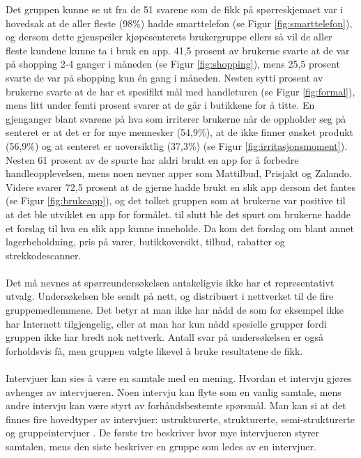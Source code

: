 Det gruppen kunne se ut fra de 51 svarene som de fikk på spørreskjemaet var i hovedsak at de aller fleste (98\%) hadde smarttelefon (se Figur \ref{fig:smarttelefon}), og dersom dette gjenspeiler kjøpesenterets brukergruppe ellers så vil de aller fleste kundene kunne ta i bruk en app. 41,5 prosent av brukerne svarte at de var på shopping 2-4 ganger i måneden (se Figur \ref{fig:shopping}), mens 25,5 prosent svarte de var på shopping kun én gang i måneden. Nesten sytti prosent av brukerne svarte at de har et spesifikt mål med handleturen (se Figur \ref{fig:formal}), mens litt under femti prosent svarer at de går i butikkene for å titte. En gjenganger blant svarene på hva som irriterer brukerne når de oppholder seg på senteret er at det er for mye mennesker (54,9\%), at de ikke finner ønsket produkt (56,9\%) og at senteret er uoversiktlig (37,3\%) (se Figur \ref{fig:irritasjonsmoment}). Nesten 61 prosent av de spurte har aldri brukt en app for å forbedre handleopplevelsen, mens noen nevner apper som Mattilbud, Prisjakt og Zalando. Videre svarer 72,5 prosent at de gjerne hadde brukt en slik app dersom det fantes (se Figur \ref{fig:brukeapp}), og det tolket gruppen som at brukerne var positive til at det ble utviklet en app for formålet. til slutt ble det spurt om brukerne hadde et forslag til hva en slik app kunne inneholde. Da kom det forslag om blant annet lagerbeholdning, pris på varer, butikkoversikt, tilbud, rabatter og strekkodescanner.
\\\\
Det må nevnes at spørreundersøkelsen antakeligvis ikke har et representativt utvalg. Undersøkelsen ble sendt på nett, og distribuert i nettverket til de fire gruppemedlemmene. Det betyr at man ikke har nådd de som for eksempel ikke har Internett tilgjengelig, eller at man har kun nådd spesielle grupper fordi gruppen ikke har bredt nok nettverk. Antall svar på undersøkelsen er også forholdsvis få, men gruppen valgte likevel å bruke resultatene de fikk. 
\\\\
Intervjuer kan sies å være en samtale med en mening\cite{kahn}. Hvordan et intervju gjøres avhenger av intervjueren. Noen intervju kan flyte som en vanlig samtale, mens andre intervju kan være styrt av forhåndsbestemte spørsmål. Man kan si at det finnes fire hovedtyper av intervjuer: ustrukturerte, strukturerte, semi-strukturerte og gruppeintervjuer \cite[s.~233]{preece}. De første tre beskriver hvor mye intervjueren styrer samtalen, mens den siste beskriver en gruppe som ledes av en intervjuer. 

